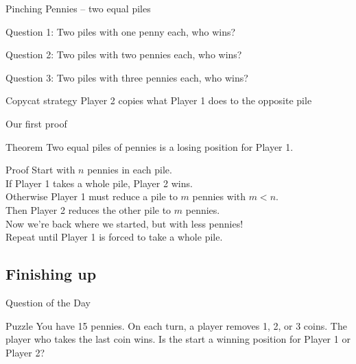 \documentclass{beamer}
\begin{document}
\begin{frame}{Pinching Pennies -- two equal piles}
\pause
  \begin{block}{Question 1:}
    Two piles with one penny each, who wins?
  \end{block}
\pause
  \begin{block}{Question 2:}
    Two piles with two pennies each, who wins?
  \end{block}
\pause
  \begin{block}{Question 3:}
    Two piles with three pennies each, who wins?
  \end{block}
\pause
  \begin{block}{Copycat strategy}
     {\color{red}Player 2} copies what {\color{blue}Player 1} does to the opposite pile
  \end{block}
\end{frame}

\begin{frame}{Our first proof}
\pause
  \begin{block}{Theorem}
    Two equal piles of pennies is a losing position for {\color{blue}Player 1}.
  \end{block}
\pause
  \begin{block}{Proof}
\pause
    Start with $n$ pennies in each pile.\\
\pause
    If {\color{blue}Player 1} takes a whole pile, {\color{red}Player 2} wins.\\
\pause
    Otherwise {\color{blue}Player 1} must reduce a pile to $m$ pennies with $m<n$.\\
\pause
    Then {\color{red}Player 2} reduces the other pile to $m$ pennies.\\
\pause
    Now we're back where we started, but with less pennies!\\
\pause
    Repeat until {\color{blue}Player 1} is forced to take a whole pile.
  \end{block}
\end{frame}

\subsection{Finishing up}
\begin{frame}{Question of the Day}
  \begin{block}{Puzzle}
    You have 15 pennies. On each turn, a player removes 1, 2, or 3 coins.  The player who takes the last coin wins. 
    Is the start a winning position for {\color{blue}Player 1} or {\color{green}Player 2}?
  \end{block}
\end{frame}
\end{document}

